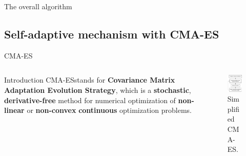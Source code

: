 \documentclass[aspectratio=169]{beamer}
\begin{document}
\begin{frame}{The overall algorithm}
    \vspace{0.1cm}
    \centering
    
\end{frame}


\subsection{Self-adaptive mechanism with CMA-ES}
\begin{frame}{CMA-ES}
    \begin{columns}
        \begin{column}{0.55\textwidth}
            \hspace{0.2cm}
            \begin{block}{Introduction}
                \justifying
                \vspace{0.2cm}
                CMA-ES\footnotemark stands for \textbf{Covariance Matrix Adaptation Evolution Strategy}, which is a \textbf{stochastic}, \textbf{derivative-free} method for numerical optimization of \textbf{non-linear} or \textbf{non-convex} \textbf{continuous} optimization problems. \\
                \vspace{0.2cm}
            \end{block}
        \end{column}

        \begin{column}{0.45\textwidth}
            \vspace{0.1cm}
            \begin{figure}
                \centering
                \includegraphics[width=0.6\columnwidth]{img/simplified_CMA-ES.pdf}
                \footnotesize
                \caption{Simplified CMA-ES.}
            \end{figure}
        \end{column}
    \end{columns}
    \footnotesize {}
\end{frame}
\end{document}
